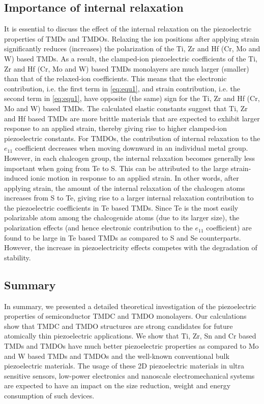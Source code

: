 \subsection{Importance of internal relaxation}

It is  essential to discuss the effect of the internal relaxation on the piezoelectric properties of TMDs and TMDOs. Relaxing the ion positions after applying strain significantly reduces (increases) the polarization of the  Ti, Zr and Hf (Cr, Mo and W) based TMDs. As a result, the clamped-ion piezoelectric coefficients of the Ti, Zr and Hf (Cr, Mo and W) based TMDs monolayers are much larger (smaller) than that of the relaxed-ion coefficients. This means that the electronic contribution, i.e. the first term in \autoref{eq:equ1}, and strain contribution, i.e. the second term in \autoref{eq:equ1}, have opposite (the same) sign for the  Ti, Zr and Hf (Cr, Mo and W) based TMDs.  The calculated elastic constants suggest that Ti, Zr and Hf based TMDs are more brittle materials that are expected to exhibit larger response to an applied strain, thereby giving rise to higher clamped-ion piezoelectric constants.  For TMDOs, the contribution of internal relaxation to the $e_{11}$ coefficient decreases when moving downward in an individual metal group. 
However, in each chalcogen group, the internal relaxation becomes  generally less important when going from Te to S. This can be attributed to the large strain-induced ionic motion in response to an applied strain. 
In other words, after applying strain, the amount of the internal relaxation of the chalcogen atoms increases from S to Te, giving rise to a larger internal relaxation contribution to the piezoelectric coefficients in Te based TMDs. 
Since Te is the most easily polarizable atom among the chalcogenide atoms (due to its larger size), the polarization effects (and hence electronic contribution to the  $e_{11}$ coefficient) are found to be large in Te based TMDs  as compared to S and Se counterparts. However, the increase in piezoelectricity effects competes with the degradation of stability.

\subsection{Summary}

In summary, we presented a detailed theoretical investigation of the piezoelectric properties of semiconductor TMDC and TMDO monolayers. Our calculations show that TMDC and TMDO structures are strong candidates for future atomically thin piezoelectric applications.  We show that Ti,  Zr, Sn and Cr based TMDs and TMDOs have much better piezoelectric properties as compared to Mo and W based 
TMDs and TMDOs and the well-known conventional bulk piezoelectric materials.
The usage of these 2D piezoelectric materials in ultra sensitive sensors, low-power electronics and nanoscale electromechanical systems are expected to have an impact on the size reduction, weight and energy consumption of such devices. 

